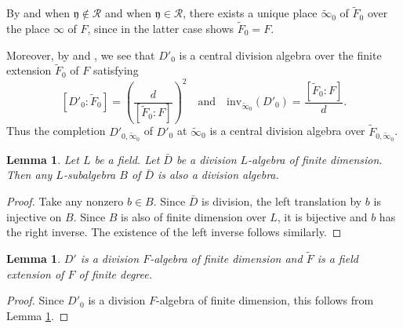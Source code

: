 \documentclass[10pt]{amsart}
\theoremstyle{plain}
\newtheorem{lem}[thm]{Lemma}
\theoremstyle{definition}
\newcommand{\inv}{\mathrm{inv}}
\newcommand{\cR}{\mathcal{R}}
\newcommand{\fry}{\mathfrak{y}}
\begin{document}
By \cite[Propositon 9.9 (ii)]{LRS} and \cite[Corollary 9.10]{LRS} when $\fry\notin \cR$ and \cite[Proposition 5.2]{Hau} when $\fry\in \cR$,
there exists a unique place $
\tilde{\infty}_0$ of $\tilde{F}_0$ over the place $\infty$ of $F$, since in the latter case \cite[Proposition 5.2]{Hau} shows $\tilde{F}_0=F$.


Moreover, by \cite[Corollary 9.10]{LRS} and \cite[Proposition 5.2]{Hau}, we see that $D'_0$ is
a central division algebra over the finite extension $\tilde{F}_0$ of $F$ satisfying 
\[
[D'_0:\tilde{F}_0]=\left(\frac{d}{[\tilde{F}_0:F]}\right)^2\quad \text{and}\quad \inv_{\tilde{\infty}_0}(D'_0)=\frac{[\tilde{F}_0:F]}{d}.
\]
Thus the completion $D'_{0,\tilde{\infty}_0}$ of $D'_0$ at $\tilde{\infty}_0$ is a central division algebra over $
\tilde{F}_{0,\tilde{\infty}_0}$.




\begin{lem}\label{LemSubalgDivision}
	Let $L$ be a field. Let $\bar{D}$ be a division $L$-algebra of finite dimension.
	Then any $L$-subalgebra $B$ of $\bar{D}$ is also a division algebra.  
\end{lem}
\begin{proof}
	Take any nonzero $b\in B$. Since $\bar{D}$ is division, the left translation by $b$ is injective on $B$.
	Since $B$ is also of finite dimension over $L$, it is bijective and $b$ has the right inverse.
	The existence of the left inverse follows similarly.
\end{proof}

\begin{lem}\label{LemEndRingDivision}
	$D'$ is a division $F$-algebra of finite dimension and $\tilde{F}$ is a field extension of $F$ of finite degree.
\end{lem}
\begin{proof}
	Since $D'_0$ is a division $F$-algebra of finite dimension, this follows from Lemma \ref{LemSubalgDivision}.	
\end{proof}
\end{document}
